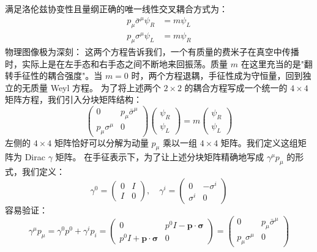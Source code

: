 满足洛伦兹协变性且量纲正确的唯一线性交叉耦合方式为：
\begin{align}
    p_\mu \bar{\sigma}^\mu \psi_R &= m \psi_L \label{eq:weyl_coupled1} \\
    p_\mu \sigma^\mu \psi_L &= m \psi_R \label{eq:weyl_coupled2}
\end{align}
物理图像极为深刻： 这两个方程告诉我们，一个有质量的费米子在真空中传播时，实际上是在左手态和右手态之间不断地来回振荡。质量 $m$ 在这里充当的是"翻转手征性的耦合强度"。当 $m = 0$ 时，两个方程退耦，手征性成为守恒量，回到独立的无质量 Weyl 方程。
为了将上述两个 $2 \times 2$ 的耦合方程写成一个统一的 $4 \times 4$ 矩阵方程，我们引入分块矩阵结构：
\begin{equation}
    \begin{pmatrix} 0 & p_\mu \bar{\sigma}^\mu \\ p_\mu \sigma^\mu & 0 \end{pmatrix} \begin{pmatrix} \psi_R \\ \psi_L \end{pmatrix} = m \begin{pmatrix} \psi_R \\ \psi_L \end{pmatrix}
\end{equation}
左侧的 $4 \times 4$ 矩阵恰好可以分解为动量 $p_\mu$ 乘以一组 $4 \times 4$ 矩阵。我们定义这组矩阵为 Dirac $\gamma$ 矩阵。
在手征表示下，为了让上述分块矩阵精确地写成 $\gamma^\mu p_\mu$ 的形式，我们定义：
\begin{equation}
    \gamma^0 = \begin{pmatrix} 0 & I \\ I & 0 \end{pmatrix}, \quad \gamma^i = \begin{pmatrix} 0 & -\sigma^i \\ \sigma^i & 0 \end{pmatrix}
\end{equation}
容易验证：
\begin{equation}
    \gamma^\mu p_\mu = \gamma^0 p^0 + \gamma^i p_i = \begin{pmatrix} 0 & p^0 I - \boldsymbol{p}\cdot\boldsymbol{\sigma} \\ p^0 I + \boldsymbol{p}\cdot\boldsymbol{\sigma} & 0 \end{pmatrix} = \begin{pmatrix} 0 & p_\mu \bar{\sigma}^\mu \\ p_\mu \sigma^\mu & 0 \end{pmatrix}
\end{equation}
